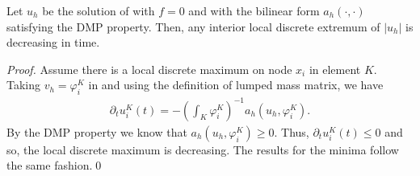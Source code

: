 \begin{lemma}
Let $u_h$ be the solution of  with $f=0$ and with the bilinear form $a_h(\cdot,\cdot)$ satisfying the DMP property. Then, any interior local discrete extremum of $|u_h|$ is decreasing in time.
\end{lemma}
\begin{proof}
Assume there is a local discrete maximum on node $x_i$ in element $K$. Taking $v_h=\varphi_i^K$ in  and using the definition of lumped mass matrix, we have
\begin{align*}
\partial_t u_i^K(t) = - \left(\int_K \varphi_i^K\right)^{-1} a_h(u_h,\varphi_i^K).
\end{align*}
By the DMP property we know that $a_h(u_h,\varphi_i^K)\geq0$. Thus, $\partial_t u_i^K(t)\leq 0$ and so, the local discrete maximum is decreasing. The results for the minima follow the same fashion.\qed
\end{proof}

